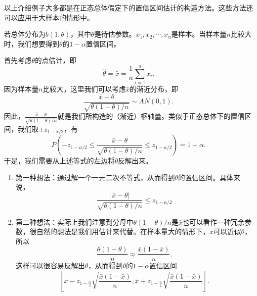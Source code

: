 以上介绍例子大多都是在正态总体假定下的置信区间估计的构造方法。这些方法还可以应用于大样本的情形中。
\begin{example}
若总体分布为$b(1,\theta)$，其中$\theta$是待估参数。$x_1,x_2,\cdots,x_n$是样本。当样本量$n$比较大时，我们想要得到$\theta$的$1-\alpha$置信区间。

首先考虑$\theta$的点估计，即
$$
\hat{\theta} = \bar{x} = \frac{1}{n}\sum_{i=1}^n x_i.
$$
因为样本量$n$比较大，这里我们可以考虑$\bar{x}$的渐近分布，即
$$
\frac{\bar{x} - \theta}{\sqrt{\theta(1-\theta)/n}} \sim  AN(0,1).
$$
因此，$\frac{\bar{x} - \theta}{\sqrt{\theta(1-\theta)/n}} $就是我们所构造的（渐近）枢轴量。类似于正态总体下的置信区间，我们取$\pm z_{1-\alpha/2}$，有
$$
P\left( - z_{1-\alpha/2} \leq \frac{\bar{x} - \theta}{\sqrt{\theta(1-\theta)/n}}  \leq  z_{1-\alpha/2} \right)= 1-\alpha.
$$
于是，我们需要从上述等式的左边将$\theta$反解出来。
\begin{enumerate}
    \item 第一种想法：通过解一个一元二次不等式，从而得到$\theta$的置信区间。具体来说，
    $$
    \frac{|\bar{x} - \theta|}{\sqrt{\theta(1-\theta)/n}}  \leq  z_{1-\alpha/2}
    $$
    \vspace{3cm}
    \item 第二种想法：实际上我们注意到分母中$\theta(1-\theta)/n$是$\bar{x}$也可以看作一种冗余参数，很自然的想法是我们用估计来代替。在样本量大的情形下，$\bar{x}$可以近似$\theta$，所以
    $$
    \frac{\theta(1-\theta)}{n} \approx  \frac{\bar{x}(1-\bar{x})}{n}.
    $$
    这样可以很容易反解出$\theta$，从而得到$\theta$的$1-\alpha$置信区间
    $$
    \left [ \bar{x}-z_{1-\frac{\alpha }{2} }\sqrt{\frac{\bar{x}(1-\bar{x})}{n} }  ,\bar{x}+z_{1-\frac{\alpha }{2} }\sqrt{\frac{\bar{x}(1-\bar{x})}{n} } \right ] .
    $$
\end{enumerate}
\end{example}


